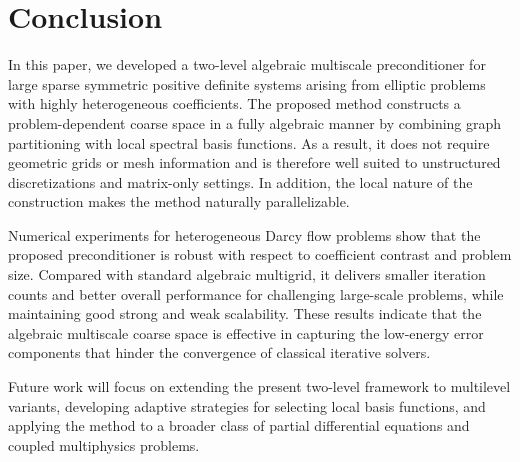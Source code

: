 \documentclass[preprint,12pt]{elsarticle}
\begin{document}
  \section{Conclusion}
  \label{sec:conclusion}

  In this paper, we developed a two-level algebraic multiscale preconditioner for
  large sparse symmetric positive definite systems arising from elliptic problems
  with highly heterogeneous coefficients. The proposed method constructs a
  problem-dependent coarse space in a fully algebraic manner by combining graph
  partitioning with local spectral basis functions. As a result, it does not
  require geometric grids or mesh information and is therefore well suited to
  unstructured discretizations and matrix-only settings. In addition, the local
  nature of the construction makes the method naturally parallelizable.

  Numerical experiments for heterogeneous Darcy flow problems show that the
  proposed preconditioner is robust with respect to coefficient contrast and
  problem size. Compared with standard algebraic multigrid, it delivers smaller
  iteration counts and better overall performance for challenging large-scale
  problems, while maintaining good strong and weak scalability. These results
  indicate that the algebraic multiscale coarse space is effective in capturing
  the low-energy error components that hinder the convergence of classical
  iterative solvers.

  Future work will focus on extending the present two-level framework to
  multilevel variants, developing adaptive strategies for selecting local basis functions,
  and applying the method to a broader class of partial differential equations
  and coupled multiphysics problems.



  
  
\end{document}
